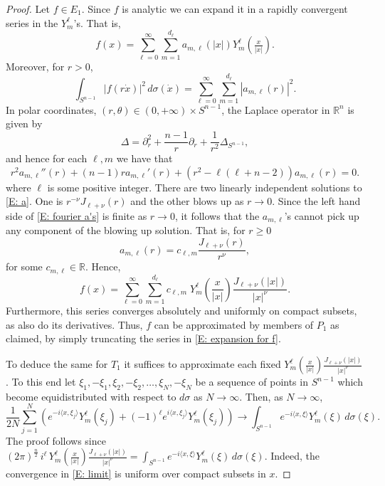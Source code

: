 \documentclass[11pt,reqno]{amsart}
\newcommand{\R}{{\mathbb R}}
\theoremstyle{definition}
\begin{document}
\begin{proof}
Let $f\in E_1$. Since $f$ is analytic we can expand it in a rapidly convergent series in the $Y^\ell_m$'s. That is, 
\[f(x)=\sum_{\ell=0}^\infty \sum_{m=1}^{d_\ell} a_{m,\ell}(|x|)Y^\ell_m( \tfrac{x}{|x|}).\]
Moreover, for $r>0$,
\begin{equation}\label{E: fourier a's}
\int_{S^{n-1}}|f(r \dot x)|^2\, d\sigma(\dot x)= \sum_{\ell=0}^\infty \sum_{m=1}^{d_\ell} |a_{m,\ell}(r)|^2.
\end{equation}
In polar coordinates, $(r, \theta) \in (0, +\infty)\times S^{n-1}$,   the Laplace operator in $\R^n$  is given by  
\[\Delta= \partial_r^2 + \frac{n-1}{r} \partial_r  +\frac{1}{r^2} \Delta_{S^{n-1}},\] 
and hence for each $\ell,m$ we have that 
 \begin{equation}\label{E: a}
 r^2a_{m,\ell}''(r) + (n-1) r a_{m,\ell}'(r) +(r^2- \ell(\ell+n-2))a_{m,\ell}(r)=0.
 \end{equation}
where $\ell$ is some positive integer.
There are two linearly independent solutions to \eqref{E: a}. One is $r^{-\nu}J_{\ell+\nu}(r)$ and the other blows up as $r \to 0$. Since the left hand side of \eqref{E: fourier a's} is finite as $r\to 0$, it follows that the $ a_{m,\ell}$'s cannot pick up any component of the blowing up solution. That is, for $r \geq 0$
\[ a_{m,\ell}(r)= c_{\ell,m}  \frac{J_{\ell +\nu}(r)}{r^\nu},\]
for some $c_{m,\ell} \in \R$.
Hence, 
\begin{equation}\label{E:  expansion for f}
{f}(x)=\sum_{\ell=0}^\infty \sum_{m=1}^{d_{\ell}} c_{\ell,m} \; Y^\ell_m \left(\frac{x}{|x|}\right) \frac{J_{\ell + \nu}(|x|)}{|x|^{\nu}}.
\end{equation}
Furthermore, this series converges absolutely and uniformly on compact subsets, as also do its derivatives. Thus, $f$ can be approximated by members of $P_1$ as claimed, by simply truncating the series in \eqref{E:  expansion for f}. 

To deduce the same for $T_1$ it suffices to approximate each fixed $Y^\ell_m \left(\frac{x}{|x|}\right) \frac{J_{\ell + \nu}(|x|)}{|x|^{\nu}}$. To this end let $\xi_1, -\xi_1, \xi_2, -\xi_2,\dots ,\xi_N, -\xi_N$ be a sequence of points in $S^{n-1}$ which become equidistributed with respect to $d\sigma$  as $N \to \infty$.
Then, as $N\to \infty$,
\begin{equation}\label{E: limit}
 \frac{1}{2N} \sum_{j=1}^N \left( e^{-i \langle x, \xi_j \rangle} Y^\ell_m(\xi_j)+ (-1)^\ell e^{i \langle x, \xi_j \rangle} Y^\ell_m(\xi_j)\right) \longrightarrow \int_{S^{n-1}} e^{-i \langle x, \xi \rangle} Y^\ell_m(\xi) \,d\sigma(\xi).
 \end{equation}
The proof follows since $(2\pi)^{\frac{n}{2}}\, i^\ell\, Y^\ell_m \left(\frac{x}{|x|}\right) \frac{J_{\ell + \nu}(|x|)}{|x|^{\nu}}= \int_{S^{n-1}} e^{-i \langle x, \xi \rangle} Y^\ell_m(\xi) \,d\sigma(\xi)$. Indeed, the convergence in \eqref{E: limit} is uniform over compact subsets in $x$. 
\end{proof}
\end{document}
